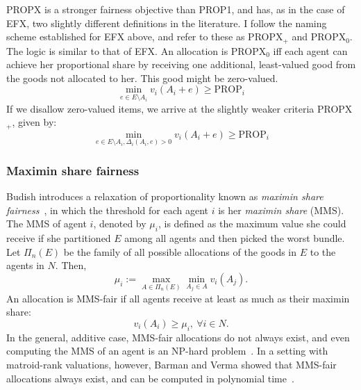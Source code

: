 PROPX is a stronger fairness objective than PROP1, and has, as in the case of EFX, two slightly different definitions in the literature. I follow the naming scheme established for EFX above, and refer to these as PROPX$_+$ and PROPX$_0$. The logic is similar to that of EFX. An allocation is PROPX$_0$ iff each agent can achieve her proportional share by receiving one additional, least-valued good from the goods not allocated to her. This good might be zero-valued.
\begin{equation}\tag{PROPX$_0$}
  \min_{e\in E\setminus A_i}v_i(A_i + e)\geq\text{PROP}_i
\end{equation}
If we disallow zero-valued items, we arrive at the slightly weaker criteria PROPX$_+$, given by:
\begin{equation}\tag{PROPX$_+$}
  \min_{e\in E\setminus A_i, \Delta_i(A_i, e)>0}v_i(A_i + e)\geq\text{PROP}_i
\end{equation}

\subsubsection*{Maximin share fairness}

Budish introduces a relaxation of proportionality known as \textit{maximin share fairness}~\cite{Budish2011}, in which the threshold for each agent $i$ is her \textit{maximin share} (MMS). The MMS of agent $i$, denoted by $\mu_i$, is defined as the maximum value she could receive if she partitioned $E$ among all agents and then picked the worst bundle. Let $\Pi_n(E)$ be the family of all possible allocations of the goods in $E$ to the agents in $N$. Then,
$$\mu_i := \max_{A\in \Pi_n(E)} \min_{A_j \in A} v_i(A_j).$$
An allocation is MMS-fair if all agents receive at least as much as their maximin share:
\begin{equation} \tag{MMS}
  v_i(A_i) \geq \mu_i,\ \forall i \in N.
\end{equation}
In the general, additive case, MMS-fair allocations do not always exist, and even computing the MMS of an agent is an NP-hard problem~\cite{amanatidis2022fair}. In a setting with matroid-rank valuations, however, Barman and Verma showed that MMS-fair allocations always exist, and can be computed in polynomial time~\cite{barman2021existence}.

